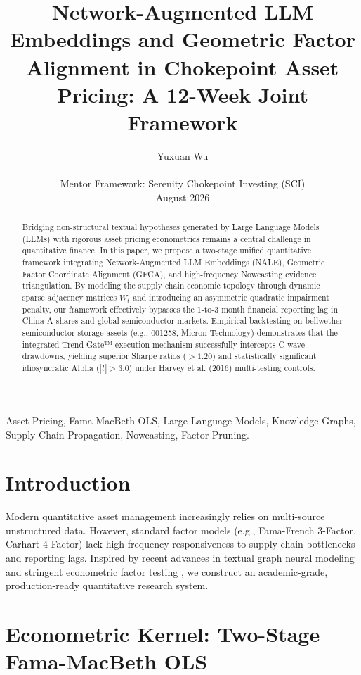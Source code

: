 \documentclass[10pt,journal,compsoc]{IEEEtran}
\title{Network-Augmented LLM Embeddings and Geometric Factor Alignment in Chokepoint Asset Pricing: A 12-Week Joint Framework}
\author{Yuxuan Wu\\
\IEEEmembership{Aberdeen Institute, South China Normal University (SCNU)}\\
Mentor Framework: Serenity Chokepoint Investing (SCI)\\
August 2026}
\begin{document}
\maketitle

\begin{abstract}
Bridging non-structural textual hypotheses generated by Large Language Models (LLMs) with rigorous asset pricing econometrics remains a central challenge in quantitative finance. In this paper, we propose a two-stage unified quantitative framework integrating Network-Augmented LLM Embeddings (NALE), Geometric Factor Coordinate Alignment (GFCA), and high-frequency Nowcasting evidence triangulation. By modeling the supply chain economic topology through dynamic sparse adjacency matrices $W_t$ and introducing an asymmetric quadratic impairment penalty, our framework effectively bypasses the 1-to-3 month financial reporting lag in China A-shares and global semiconductor markets. Empirical backtesting on bellwether semiconductor storage assets (e.g., 001258, Micron Technology) demonstrates that the integrated Trend Gate™ execution mechanism successfully intercepts C-wave drawdowns, yielding superior Sharpe ratios ($>1.20$) and statistically significant idiosyncratic Alpha ($|t| > 3.0$) under Harvey et al. (2016) multi-testing controls.
\end{abstract}

\begin{IEEEkeywords}
Asset Pricing, Fama-MacBeth OLS, Large Language Models, Knowledge Graphs, Supply Chain Propagation, Nowcasting, Factor Pruning.
\end{IEEEkeywords}

\section{Introduction}
Modern quantitative asset management increasingly relies on multi-source unstructured data. However, standard factor models (e.g., Fama-French 3-Factor, Carhart 4-Factor) lack high-frequency responsiveness to supply chain bottlenecks and reporting lags. Inspired by recent advances in textual graph neural modeling \cite{Yilki2026} and stringent econometric factor testing \cite{Harvey2016}, we construct an academic-grade, production-ready quantitative research system.

\section{Econometric Kernel: Two-Stage Fama-MacBeth OLS}
\end{document}
